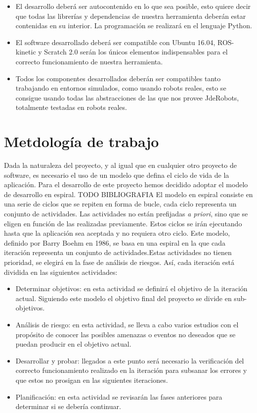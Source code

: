 \begin{itemize}
\item El desarrollo deberá ser autocontenido en lo que sea posible, esto quiere decir que todas las librerías y dependencias de nuestra herramienta deberán estar contenidas en su interior. La programación se realizará en el
lenguaje Python.
\item El software desarrollado deberá ser compatible con Ubuntu 16.04, ROS-kinetic y Scratch 2.0 serán los únicos elementos indispensables para el correcto funcionamiento de nuestra herramienta.
\item Todos los componentes desarrollados deberán ser compatibles tanto trabajando en entornos simulados, como usando robots reales, esto se consigue usando todas las abstracciones de las que nos provee JdeRobots, totalmente testadas en robots reales.
\end{itemize}



\section{Metdología de trabajo}
\label{sec:metodologia}

Dada la naturaleza del proyecto, y al igual que en cualquier otro proyecto de software, es necesario el uso de un modelo que defina el ciclo de vida de la aplicación. Para el desarrollo de este proyecto hemos decidido adoptar el modelo de desarrollo en espiral.
TODO BIBLIOGRAFIA
El modelo en espiral consiste en una serie de ciclos que se repiten en forma de
bucle, cada ciclo representa un conjunto de actividades. Las actividades no están
prefijadas \textit{a priori}, sino que se eligen en función de las realizadas previamente. Estos
ciclos se irán ejecutando hasta que la aplicación sea aceptada y no requiera otro
ciclo. Este modelo, definido por Barry Boehm en 1986, se basa en una espiral en la que cada iteración representa un conjunto de actividades.Estas actividades no tienen prioridad, se elegirá en la fase de análisis de riesgos. Así, cada iteración está dividida en las siguientes actividades:

\begin{itemize}
\item Determinar objetivos: en esta actividad se definirá el objetivo de la iteración actual. Siguiendo este
modelo el objetivo final del proyecto se divide en sub-objetivos.
\item Análisis de riesgo: en esta actividad, se lleva a cabo varios estudios con el propósito de conocer las
posibles amenazas o eventos no deseados que se puedan producir en el objetivo actual.
\item Desarrollar y probar: llegados a este punto será necesario la verificación del correcto funcionamiento realizado en la iteración para subsanar los errores y que estos no prosigan en las siguientes iteraciones.
\item Planificación: en esta actividad se revisarán las fases anteriores para determinar si se debería continuar.
\end{itemize}

